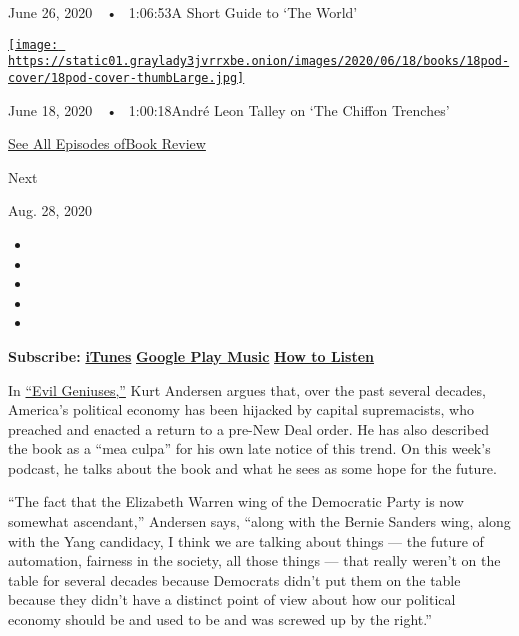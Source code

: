 June 26, 2020~~•~ 1:06:53A Short Guide to `The World'

\href{https://www.nytimes3xbfgragh.onion/2020/06/18/books/review/andre-leon-talley-chiffon-trenches-claudia-rankine-jericho-brown-megha-majumdar-burning.html?action=click\&module=audio-series-bar\&region=header\&pgtype=Article}{\texttt{[image: https://static01.graylady3jvrrxbe.onion/images/2020/06/18/books/18pod-cover/18pod-cover-thumbLarge.jpg]}}

June 18, 2020~~•~ 1:00:18André Leon Talley on `The Chiffon Trenches'

\href{https://www.nytimes3xbfgragh.onion/column/book-review-podcast}{See
All Episodes ofBook Review}

Next

Aug. 28, 2020

\begin{itemize}
\item
\item
\item
\item
\item
\end{itemize}

\textbf{Subscribe:}
\textbf{\href{https://itunes.apple.com/us/podcast/book-review/id120315179?mt=2}{iTunes}}
\textbf{\textbar{}}
\textbf{\href{https://play.google.com/music/listen?u=0\#/ps/Iv6zeb5qwjtzjfbyo3vy5zny5ky}{Google
Play Music}} \textbf{\textbar{}}
\textbf{\href{https://www.nytimes3xbfgragh.onion/2018/08/03/books/review/how-to-listen-to-the-book-review-podcast.html}{How
to Listen}}

In
\href{https://www.nytimes3xbfgragh.onion/2020/08/11/books/review/kurt-andersen-evil-geniuses.html}{``Evil
Geniuses,''} Kurt Andersen argues that, over the past several decades,
America's political economy has been hijacked by capital supremacists,
who preached and enacted a return to a pre-New Deal order. He has also
described the book as a ``mea culpa'' for his own late notice of this
trend. On this week's podcast, he talks about the book and what he sees
as some hope for the future.

``The fact that the Elizabeth Warren wing of the Democratic Party is now
somewhat ascendant,'' Andersen says, ``along with the Bernie Sanders
wing, along with the Yang candidacy, I think we are talking about things
--- the future of automation, fairness in the society, all those things
--- that really weren't on the table for several decades because
Democrats didn't put them on the table because they didn't have a
distinct point of view about how our political economy should be and
used to be and was screwed up by the right.''

